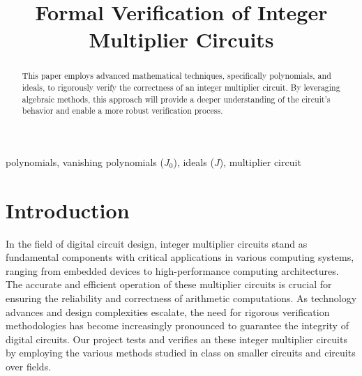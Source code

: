 \documentclass[conference]{IEEEtran}
\begin{document}
\title{Formal Verification of Integer Multiplier Circuits\\}

\author{
\and
{}
\and
{}
\and
{}
}

\maketitle

\begin{abstract}
This paper employs advanced mathematical techniques, specifically polynomials, and ideals, 
to rigorously verify the correctness of an integer multiplier circuit. By leveraging algebraic methods, 
this approach will provide a deeper understanding of the circuit's behavior and enable a more robust 
verification process. 
\end{abstract}

\begin{IEEEkeywords}
polynomials, vanishing polynomials ($J_{0}$), ideals ($J$), multiplier circuit
\end{IEEEkeywords}

\section{Introduction}
In the field of digital circuit design, integer multiplier circuits stand as fundamental components with critical applications in various computing 
systems, ranging from embedded devices to high-performance computing architectures. The accurate and efficient operation of these multiplier 
circuits is crucial for ensuring the reliability and correctness of arithmetic computations. As technology advances and design complexities 
escalate, the need for rigorous verification methodologies has become increasingly pronounced to guarantee the integrity of digital circuits. Our 
project tests and verifies an these integer multiplier circuits by employing the various methods studied in class on smaller circuits and circuits over
fields.
\end{document}
